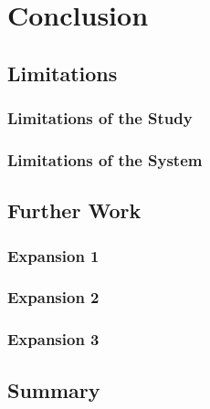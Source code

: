 \documentclass[a4paper, 11pt, twocolumn, twoside]{report}
\begin{document}
\chapter{Conclusion}

\section{Limitations}

\subsection{Limitations of the Study}

\subsection{Limitations of the System}

\section{Further Work}

\subsection{Expansion 1}

\subsection{Expansion 2}

\subsection{Expansion 3}

\section{Summary}


\end{document}
